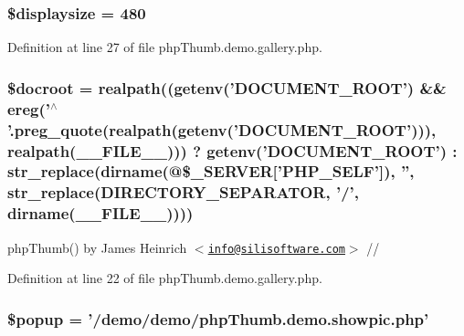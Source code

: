 \hypertarget{php_thumb_8demo_8gallery_8php_ab940018ec6099d0ef2fc17e08485d308}{
\subsubsection[{\$displaysize}]{\setlength{\rightskip}{0pt plus 5cm}\$displaysize = 480}}\label{php_thumb_8demo_8gallery_8php_ab940018ec6099d0ef2fc17e08485d308}


\-Definition at line 27 of file php\-Thumb.\-demo.\-gallery.\-php.

\hypertarget{php_thumb_8demo_8gallery_8php_a4871a20ac1575ecfd9b966eb667f713b}{
\subsubsection[{\$docroot}]{\setlength{\rightskip}{0pt plus 5cm}\$docroot = realpath((getenv('\-D\-O\-C\-U\-M\-E\-N\-T\-\_\-\-R\-O\-O\-T') \&\& ereg('$^\wedge$'.preg\-\_\-quote(realpath(getenv('\-D\-O\-C\-U\-M\-E\-N\-T\-\_\-\-R\-O\-O\-T'))), realpath(\-\_\-\-\_\-\-F\-I\-L\-E\-\_\-\-\_\-))) ? getenv('\-D\-O\-C\-U\-M\-E\-N\-T\-\_\-\-R\-O\-O\-T') \-: str\-\_\-replace(dirname(@\$\-\_\-\-S\-E\-R\-V\-E\-R\mbox{[}'\-P\-H\-P\-\_\-\-S\-E\-L\-F'\mbox{]}), '', str\-\_\-replace(\-D\-I\-R\-E\-C\-T\-O\-R\-Y\-\_\-\-S\-E\-P\-A\-R\-A\-T\-O\-R, '/', dirname(\-\_\-\-\_\-\-F\-I\-L\-E\-\_\-\-\_\-))))}}\label{php_thumb_8demo_8gallery_8php_a4871a20ac1575ecfd9b966eb667f713b}
php\-Thumb() by \-James \-Heinrich $<$\href{mailto:info@silisoftware.com}{\tt info@silisoftware.\-com}$>$ // 

\-Definition at line 22 of file php\-Thumb.\-demo.\-gallery.\-php.

\hypertarget{php_thumb_8demo_8gallery_8php_ad0d5f37ae88e4439e6c1391b08ca9785}{
\subsubsection[{\$popup}]{\setlength{\rightskip}{0pt plus 5cm}\$popup = '/demo/demo/php\-Thumb.\-demo.\-showpic.\-php'}}\label{php_thumb_8demo_8gallery_8php_ad0d5f37ae88e4439e6c1391b08ca9785}


